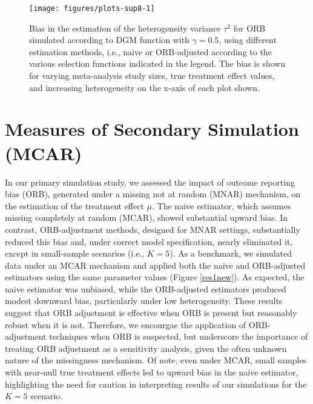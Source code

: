 \documentclass{article}\usepackage[]{graphicx}\usepackage[]{xcolor}
\begin{document}
\begin{figure}[!hbt]
\centering
\caption{Bias in the estimation of the heterogeneity variance $\tau^2$ for ORB simulated according to DGM function with $\gamma=0.5$, using different estimation methods, i.e., naive or ORB-adjusted according to the various selection functions indicated in the legend. The bias is shown for varying meta-analysis study sizes, true treatment effect values, and increasing heterogeneity on the x-axis of each plot shown.\\[0.5em]}


{\centering \texttt{[image: figures/plots-sup8-1]} 

}



\label{biastau2}
\end{figure}






\section{Measures of Secondary Simulation (MCAR)}

In our primary simulation study, we assessed the impact of outcome reporting bias (ORB), generated under a missing not at random (MNAR) mechanism, on the estimation of the treatment effect $\mu$. The naive estimator, which assumes missing completely at random (MCAR), showed substantial upward bias. In contrast, ORB-adjustment methods, designed for MNAR settings, substantially reduced this bias and, under correct model specification, nearly eliminated it, except in small-sample scenarios (i.e., $K = 5$). As a benchmark, we simulated data under an MCAR mechanism and applied both the naive and ORB-adjusted estimators using the same parameter values (Figure \ref{res1new}). As expected, the naive estimator was unbiased, while the ORB-adjusted estimators produced modest downward bias, particularly under low heterogeneity. These results suggest that ORB adjustment is effective when ORB is present but reasonably robust when it is not. Therefore, we encourgae the application of ORB-adjustment techniques when ORB is suspected, but underscore the importance of treating ORB adjustment as a sensitivity analysis, given the often unknown nature of the missingness mechanism. Of note, even under MCAR, small samples with near-null true treatment effects led to upward bias in the naive estimator, highlighting the need for caution in interpreting results of our simulations for the $K=5$ scenario.
\end{document}
